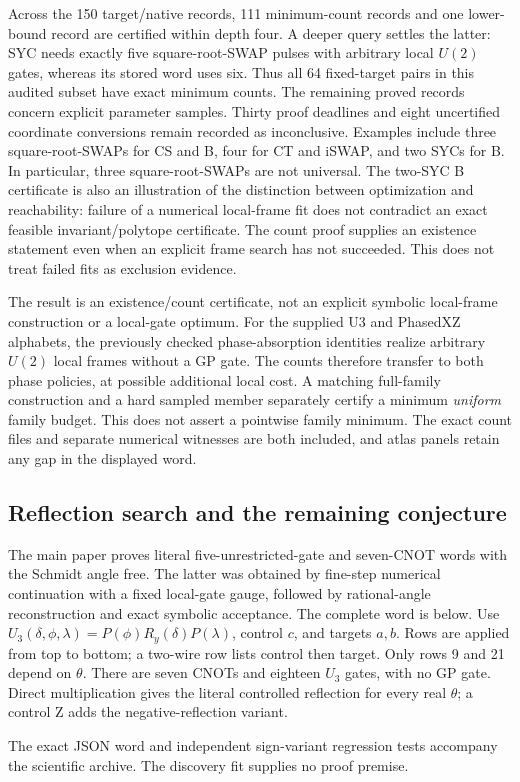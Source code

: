 \documentclass[11pt]{article}
\begin{document}
Across the 150 target/native records, 111 minimum-count records and one
lower-bound record are certified within depth four. A deeper query settles
the latter: SYC needs exactly five square-root-SWAP pulses with arbitrary
local $U(2)$ gates, whereas its stored word uses six. Thus all 64 fixed-target
pairs in this audited subset have exact minimum counts. The remaining
proved records concern explicit parameter samples. Thirty proof deadlines
and eight uncertified coordinate conversions remain recorded as inconclusive.
Examples include three square-root-SWAPs for CS and B, four for CT and iSWAP,
and two SYCs for B. In particular, three square-root-SWAPs are not universal.
The two-SYC B certificate is also an illustration of the distinction between
optimization and reachability: failure of a numerical local-frame fit does
not contradict an exact feasible invariant/polytope certificate. The count
proof supplies an existence statement even when an explicit frame search
has not succeeded. This does not treat failed fits as exclusion evidence.

The result is an existence/count certificate, not an explicit symbolic
local-frame construction or a local-gate optimum. For the supplied U3 and
PhasedXZ alphabets, the previously checked phase-absorption identities realize
arbitrary $U(2)$ local frames without a GP gate. The counts therefore transfer
to both phase policies, at possible additional local cost. A matching
full-family construction and a hard sampled member separately certify a
minimum \emph{uniform} family budget. This does not assert a pointwise family
minimum. The exact count files and separate numerical witnesses are both
included, and atlas panels retain any gap in the displayed word.

\subsection{Reflection search and the remaining conjecture}
The main paper proves literal five-unrestricted-gate and seven-CNOT words
with the Schmidt angle free. The latter was obtained by fine-step numerical
continuation with a fixed local-gate gauge, followed by rational-angle
reconstruction and exact symbolic acceptance. The complete word is below.
Use $U_3(\delta,\phi,\lambda)=P(\phi)R_y(\delta)P(\lambda)$, control $c$,
and targets $a,b$. Rows are applied from top to bottom; a two-wire row lists
control then target. Only rows 9 and 21 depend on $\theta$. There are seven
CNOTs and eighteen $U_3$ gates, with no GP gate. Direct multiplication gives
the literal controlled reflection for every real $\theta$; a control Z
adds the negative-reflection variant.

The exact JSON word and independent sign-variant regression tests accompany
the scientific archive. The discovery fit supplies no proof premise.
\end{document}
